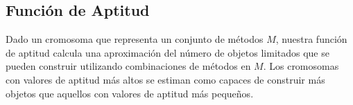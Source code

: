 \subsection{Función de Aptitud}

Dado un cromosoma que representa un conjunto de métodos $M$,
nuestra función de aptitud calcula una aproximación del número de objetos limitados que se pueden construir utilizando 
combinaciones de métodos en $M$. Los cromosomas con valores de aptitud más altos se estiman 
como capaces de construir más objetos que aquellos con valores de aptitud más pequeños.


